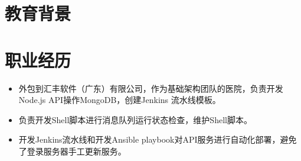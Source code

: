 \documentclass{resume}
\begin{document}






\section{教育背景}









\section{职业经历}

\begin{itemize}[parsep=0.5ex]
  \item 外包到汇丰软件（广东）有限公司，作为基础架构团队的医院，负责开发Node.js API操作MongoDB，创建Jenkins 流水线模板。
  \item 负责开发Shell脚本进行消息队列运行状态检查，维护Shell脚本。
  \item 开发Jenkins流水线和开发Ansible playbook对API服务进行自动化部署，避免了登录服务器手工更新服务。
\end{itemize}
\end{document}
